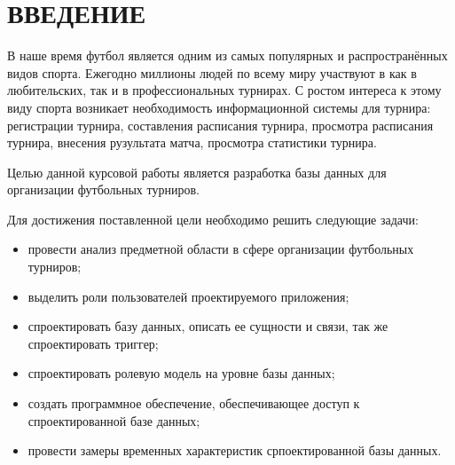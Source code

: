 \section*{\centering ВВЕДЕНИЕ}

В наше время футбол является одним из самых популярных и распространённых видов спорта.
Ежегодно миллионы людей по всему миру участвуют в как в любительских, так и в профессиональных турнирах.
С ростом интереса к этому виду спорта возникает необходимость информационной системы для турнира: регистрации турнира, составления расписания турнира, просмотра расписания турнира, внесения рузультата матча, просмотра статистики турнира.

Целью данной курсовой работы является разработка базы данных для организации футбольных турниров.

Для достижения поставленной цели необходимо решить следующие задачи:
\begin{itemize}[left=36pt]
	\item провести анализ предметной области в сфере организации футбольных турниров;
	\item выделить роли пользователей проектируемого приложения;
	\item спроектировать базу данных, описать ее сущности и связи, так же спроектировать триггер;
	\item спроектировать ролевую модель на уровне базы данных;
	\item создать программное обеспечение, обеспечивающее доступ к спроектированной базе данных;
	\item провести замеры временных характеристик српоектированной базы данных.  
\end{itemize}